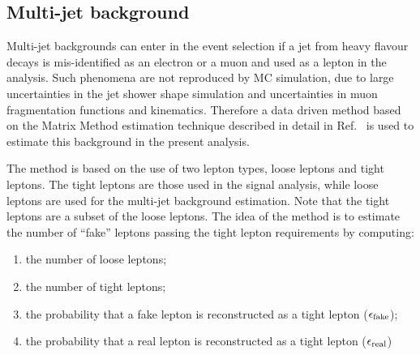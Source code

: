 \subsection{Multi-jet background}
\label{sec:multijet}
Multi-jet backgrounds can enter in the event selection if a jet from
heavy flavour decays is mis-identified as an electron or a muon and used
as a lepton in the analysis. Such phenomena are not reproduced by MC
simulation, due to large uncertainties in the jet shower shape simulation
and uncertainties in muon fragmentation functions and kinematics. Therefore
a data driven method based on the Matrix Method estimation technique
described in detail in Ref.~\cite{ConfMM} is used to estimate this
background in the present analysis.

The method is based on the use of two lepton types, loose leptons and
tight leptons. The tight leptons are those used in the signal analysis,
while loose leptons are used for the multi-jet background estimation. Note that the tight leptons are a subset of the loose leptons. The
idea of the method is to estimate the number of ``fake'' leptons passing
the tight lepton requirements by computing:

\begin{enumerate}
\item the number of loose leptons;
\item the number of tight leptons;
\item the probability that a fake lepton is reconstructed as a tight
      lepton ($\epsilon_{\rm fake}$);
\item the probability that a real lepton is reconstructed as a tight
      lepton ($\epsilon_{\rm real}$)
\end{enumerate}

